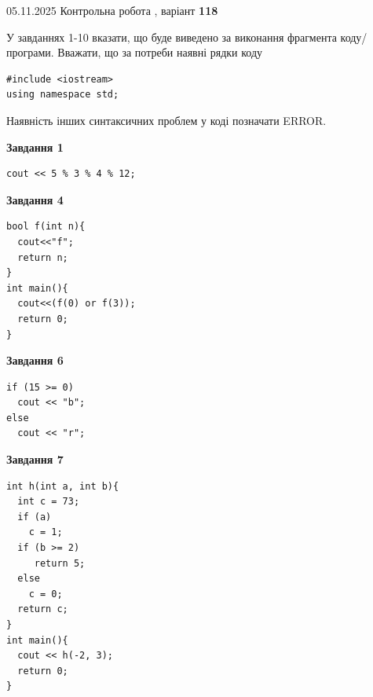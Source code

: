 \documentclass[12pt, ukrainian]{article}
\begin{document}
{\Large{05.11.2025 Контрольна робота , варіант  \No \textbf { 118 }\par}}
{
\begin {large}
У завданнях 1-10 вказати, що буде виведено за виконання фрагмента коду/про\-гра\-ми.
Вважати, що за потреби наявні рядки коду
\begin{verbatim}
#include <iostream>
using namespace std;
\end{verbatim}
Наявність інших синтаксичних проблем у коді позначати ERROR.

\begin{minipage}[t]{7.0cm}

\begin{center}
\textbf{Завдання 1}
\end{center}
\vspace{-8mm}

\begin{verbatim}
cout << 5 % 3 % 4 % 12;
\end{verbatim}



\begin{center}
\textbf{Завдання 4}
\end{center}
\vspace{-8mm}

\begin{verbatim}
bool f(int n){
  cout<<"f";
  return n;
}
int main(){
  cout<<(f(0) or f(3));
  return 0;
}
\end{verbatim}



\begin{center}
\textbf{Завдання 6}
\end{center}
\vspace{-8mm}

\begin{verbatim}
if (15 >= 0)
  cout << "b";
else
  cout << "r";
\end{verbatim}



\begin{center}
\textbf{Завдання 7}
\end{center}
\vspace{-8mm}

\begin{verbatim}
int h(int a, int b){
  int c = 73;
  if (a)
    c = 1;
  if (b >= 2)
     return 5;
  else
    c = 0;
  return c;
}
int main(){
  cout << h(-2, 3);
  return 0;
}
\end{verbatim}


\end{minipage}
\end{large}}
\end{document}
